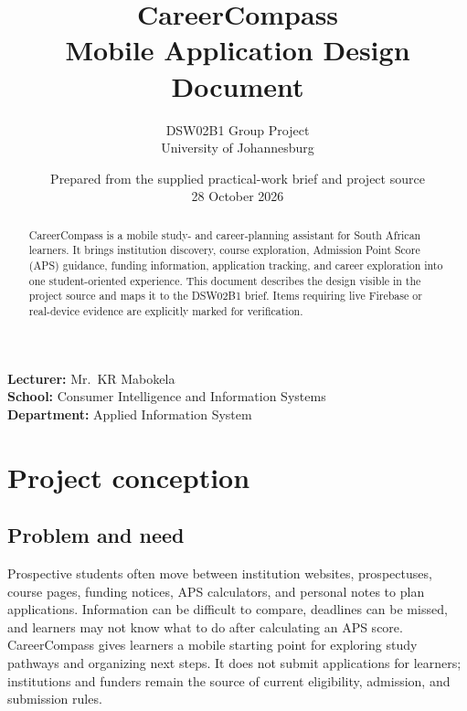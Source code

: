 \documentclass[11pt,a4paper]{article}
\title{\Huge CareerCompass\\[5pt]\Large Mobile Application Design Document}
\author{DSW02B1 Group Project\\University of Johannesburg}
\date{Prepared from the supplied practical-work brief and project source\\28 October 2026}
\begin{document}
\maketitle
\begin{center}
\textbf{Lecturer:} Mr.\ KR Mabokela\\
\textbf{School:} Consumer Intelligence and Information Systems\\
\textbf{Department:} Applied Information System
\end{center}
\begin{abstract}
CareerCompass is a mobile study- and career-planning assistant for South African learners. It brings institution discovery, course exploration, Admission Point Score (APS) guidance, funding information, application tracking, and career exploration into one student-oriented experience. This document describes the design visible in the project source and maps it to the DSW02B1 brief. Items requiring live Firebase or real-device evidence are explicitly marked for verification.
\end{abstract}
\tableofcontents
\newpage

\section{Project conception}
\subsection{Problem and need}
Prospective students often move between institution websites, prospectuses, course pages, funding notices, APS calculators, and personal notes to plan applications. Information can be difficult to compare, deadlines can be missed, and learners may not know what to do after calculating an APS score. CareerCompass gives learners a mobile starting point for exploring study pathways and organizing next steps. It does not submit applications for learners; institutions and funders remain the source of current eligibility, admission, and submission rules.
\end{document}
